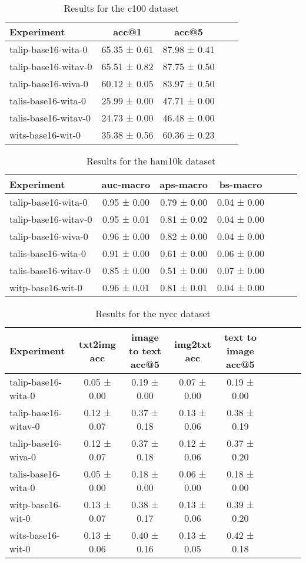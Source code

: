 \begin{table}[htbp]
\caption{Results for the c100 dataset}
\begin{tabular}{|l|c|c|c|c|}\hline
Experiment & acc@1 & acc@5\\
\hline
talip-base16-wita-0 & 65.35 ± 0.61 & 87.98 ± 0.41\\
\hline
talip-base16-witav-0 & 65.51 ± 0.82 & 87.75 ± 0.50\\
\hline
talip-base16-wiva-0 & 60.12 ± 0.05 & 83.97 ± 0.50\\
\hline
talis-base16-wita-0 & 25.99 ± 0.00 & 47.71 ± 0.00\\
\hline
talis-base16-witav-0 & 24.73 ± 0.00 & 46.48 ± 0.00\\
\hline
wits-base16-wit-0 & 35.38 ± 0.56 & 60.36 ± 0.23\\
\hline
\end{tabular}
\end{table}

\begin{table}[htbp]
\caption{Results for the ham10k dataset}
\begin{tabular}{|l|c|c|c|c|c|c|}\hline
Experiment & auc-macro & aps-macro & bs-macro\\
\hline
talip-base16-wita-0 & 0.95 ± 0.00 & 0.79 ± 0.00 & 0.04 ± 0.00\\
\hline
talip-base16-witav-0 & 0.95 ± 0.01 & 0.81 ± 0.02 & 0.04 ± 0.00\\
\hline
talip-base16-wiva-0 & 0.96 ± 0.00 & 0.82 ± 0.00 & 0.04 ± 0.00\\
\hline
talis-base16-wita-0 & 0.91 ± 0.00 & 0.61 ± 0.00 & 0.06 ± 0.00\\
\hline
talis-base16-witav-0 & 0.85 ± 0.00 & 0.51 ± 0.00 & 0.07 ± 0.00\\
\hline
witp-base16-wit-0 & 0.96 ± 0.01 & 0.81 ± 0.01 & 0.04 ± 0.00\\
\hline
\end{tabular}
\end{table}

\begin{table}[htbp]
\caption{Results for the nycc dataset}
\begin{tabular}{|l|c|c|c|c|c|c|c|c|}\hline
Experiment & txt2img acc & image to text acc@5 & img2txt acc & text to image acc@5\\
\hline
talip-base16-wita-0 & 0.05 ± 0.00 & 0.19 ± 0.00 & 0.07 ± 0.00 & 0.19 ± 0.00\\
\hline
talip-base16-witav-0 & 0.12 ± 0.07 & 0.37 ± 0.18 & 0.13 ± 0.06 & 0.38 ± 0.19\\
\hline
talip-base16-wiva-0 & 0.12 ± 0.07 & 0.37 ± 0.18 & 0.12 ± 0.06 & 0.37 ± 0.20\\
\hline
talis-base16-wita-0 & 0.05 ± 0.00 & 0.18 ± 0.00 & 0.06 ± 0.00 & 0.18 ± 0.00\\
\hline
witp-base16-wit-0 & 0.13 ± 0.07 & 0.38 ± 0.17 & 0.13 ± 0.06 & 0.39 ± 0.20\\
\hline
wits-base16-wit-0 & 0.13 ± 0.06 & 0.40 ± 0.16 & 0.13 ± 0.05 & 0.42 ± 0.18\\
\hline
\end{tabular}
\end{table}


